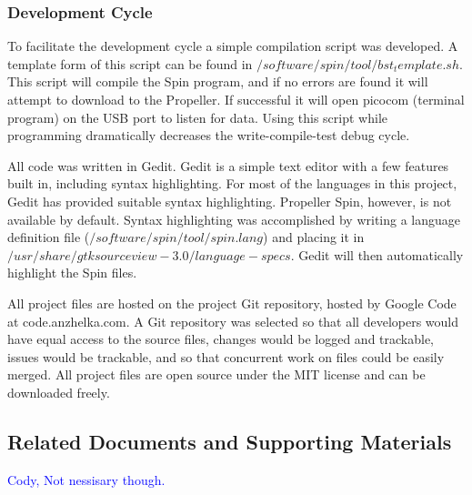 \documentclass{article}
\numberwithin{equation}{section} %
\begin{document}
\subsubsection{Development Cycle}
To facilitate the development cycle a simple compilation script was developed. A template form of this script can be found in $/software/spin/tool/bst_template.sh$. This script will compile the Spin program, and if no errors are found it will attempt to download to the Propeller. If successful it will open picocom (terminal program) on the USB port to listen for data. Using this script while programming dramatically decreases the write-compile-test debug cycle.

All code was written in Gedit. Gedit is a simple text editor with a few features built in, including syntax highlighting. For most of the languages in this project, Gedit has provided suitable syntax highlighting. Propeller Spin, however, is not available by default. Syntax highlighting was accomplished by writing a language definition file ($/software/spin/tool/spin.lang$) and placing it in $/usr/share/gtksourceview-3.0/language-specs$. Gedit will then automatically highlight the Spin files.


All project files are hosted on the project Git repository, hosted by Google Code at code.anzhelka.com. A Git repository was selected so that all developers would have equal access to the source files, changes would be logged and trackable, issues would be trackable, and so that concurrent work on files  could be easily merged. All project files are open source under the MIT license and can be downloaded freely.





\subsection{Related Documents and Supporting Materials}

\textcolor{blue}{Cody, Not nessisary though.} 


\end{document}
